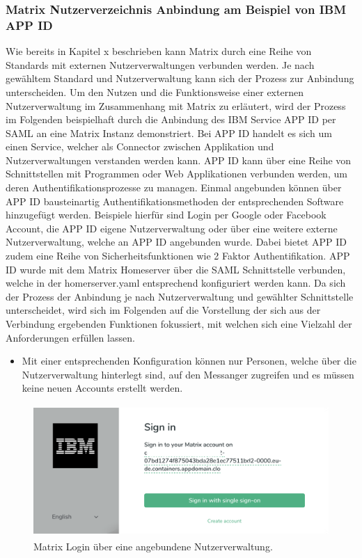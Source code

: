 \subsubsection{Matrix Nutzerverzeichnis Anbindung am Beispiel von IBM APP ID}\label{chapter:vdmf}
Wie bereits in Kapitel x beschrieben kann Matrix durch eine Reihe von Standards mit externen Nutzerverwaltungen verbunden werden.
Je nach gewähltem Standard und Nutzerverwaltung kann sich der Prozess zur Anbindung unterscheiden. Um den Nutzen und die Funktionsweise einer externen Nutzerverwaltung im Zusammenhang mit Matrix zu erläutert, wird der Prozess im Folgenden beispielhaft durch die Anbindung des IBM Service APP ID per SAML an eine Matrix Instanz demonstriert. Bei APP ID handelt es sich um einen Service, welcher als Connector zwischen Applikation und Nutzerverwaltungen verstanden werden kann. APP ID kann über eine Reihe von Schnittstellen mit Programmen oder Web Applikationen verbunden werden, um deren Authentifikationsprozesse zu managen. Einmal angebunden können über APP ID bausteinartig Authentifikationsmethoden der entsprechenden Software hinzugefügt werden. Beispiele hierfür sind Login per Google oder Facebook Account, die APP ID eigene Nutzerverwaltung oder über eine weitere externe Nutzerverwaltung, welche an APP ID angebunden wurde. Dabei bietet APP ID zudem eine Reihe von Sicherheitsfunktionen wie 2 Faktor Authentifikation.
APP ID wurde mit dem Matrix Homeserver über die SAML Schnittstelle verbunden, welche in der homerserver.yaml entsprechend konfiguriert werden kann. Da sich der Prozess der Anbindung je nach Nutzerverwaltung und gewählter Schnittstelle unterscheidet, wird sich im Folgenden auf die Vorstellung der sich aus der Verbindung ergebenden Funktionen fokussiert, mit welchen sich eine Vielzahl der Anforderungen erfüllen lassen.

\begin{itemize}
    \item Mit einer entsprechenden Konfiguration können nur Personen, welche über die Nutzerverwaltung hinterlegt sind, auf den Messanger zugreifen und es müssen keine neuen Accounts erstellt werden. 
\end{itemize}

\begin{figure}[htb]
    \centering
    \includegraphics[height=5cm]{graphics/sso.png}
    \caption[Matrix Login über eine angebundene Nutzerverwaltung]{Matrix Login über eine angebundene Nutzerverwaltung.\footnotemark}
    \label{abb:DHBWLogo}
\end{figure}

